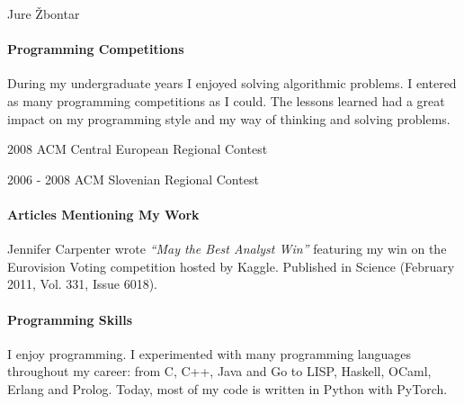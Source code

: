 \documentclass[12pt,a4paper]{article}
\begin{document}
\begin{cv}{Jure \v{Z}bontar}
\paragraph*{Programming Competitions}
During my undergraduate years I enjoyed solving algorithmic problems. I entered
as many programming competitions as I could. The lessons learned had a great
impact on my programming style and my way of thinking and solving problems.

\begin{cvlist}{}
\item[2008] ACM Central European Regional Contest
\item[2006 - 2008] ACM Slovenian Regional Contest
\end{cvlist}

\paragraph*{Articles Mentioning My Work}
Jennifer Carpenter wrote \textit{``May the Best Analyst Win''} featuring my win on the
Eurovision Voting competition hosted by Kaggle. Published in Science (February
2011, Vol.  331, Issue 6018).

\paragraph*{Programming Skills}
I enjoy programming. I experimented with many programming languages throughout my
career: from C, C++, Java and Go to LISP, Haskell, OCaml, Erlang and Prolog.
Today, most of my code is written in Python with PyTorch.

\vspace{1cm}
\nocite{*}
{}


\end{cv}
\end{document}
